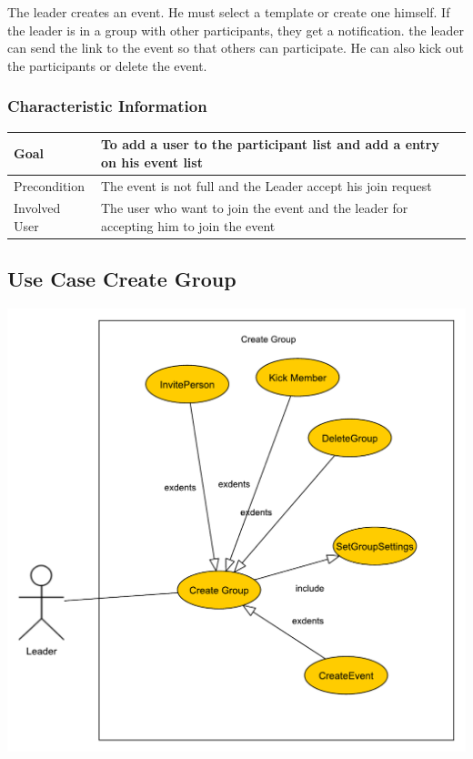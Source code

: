 \documentclass[12pt]{article}
\theoremstyle{definition}
\begin{document}
The leader creates an event. He must select a template or create one himself. If the leader is in a group with other participants, they get a notification. the leader can send the link to the event so that others can participate. He can also kick out the participants or delete the event.

\subsubsection{Characteristic Information}

\begin{tabular}{|l|l|}
\hline
Goal & To add a user to the participant list and add a entry on his event list \\ \hline
Precondition &  The event is not full and the Leader accept his join request\\ \hline
Involved User &  The user who want to join the event and the leader for accepting him to join the event\\ \hline

\end{tabular}

\subsection{Use Case Create Group}

\includegraphics[scale=.5]{Usecase/CreateGroup.pdf}
\end{document}
